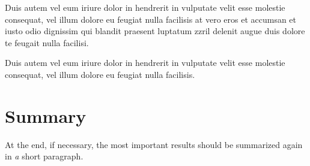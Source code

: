 Duis autem vel eum iriure dolor in hendrerit in vulputate velit esse molestie consequat, vel illum dolore eu feugiat nulla facilisis at vero eros et accumsan et iusto odio dignissim qui blandit praesent luptatum zzril delenit augue duis dolore te feugait nulla facilisi. 

Duis autem vel eum iriure dolor in hendrerit in vulputate velit esse molestie consequat, vel illum dolore eu feugiat nulla facilisis. 

\section{Summary}
\label{ch:analysis:sec:summary}

At the end, if necessary, the most important results should be summarized again in \emph{a}
short paragraph.

